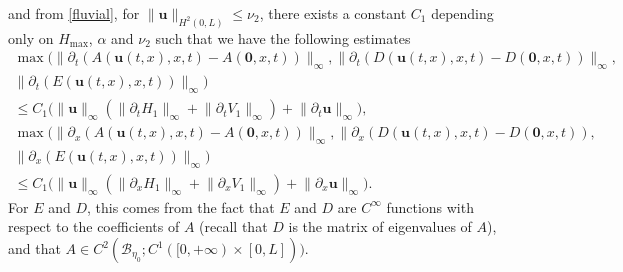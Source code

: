 and from \eqref{fluvial},
for $\lVert\boldsymbol{u}\rVert_{H^{2}(0,L)}\leq \nu_{2}$, there exists a constant $C_{1}$ depending only on $H_{\max}$, $\alpha$ and $\nu_{2}$ such that we have the following estimates
\begin{equation}
\label{ineq}
\begin{split}
\max\bigl(\lVert \partial_{t}(A(\boldsymbol{u}(t,x),x,t)-A(\boldsymbol{0},x,t))\rVert_{\infty},\lVert \partial_{t}(D(\boldsymbol{u}(t,x),x,t)-D(\boldsymbol{0},x,t))\rVert_{\infty},&\\
\lVert \partial_{t}(E(\boldsymbol{u}(t,x),x,t))\rVert_{\infty}\bigr)&\\
\leq C_{1}\bigl(\lVert\boldsymbol{u}\rVert_{\infty}(\lVert\partial_{t}H_{1}\rVert_{\infty}+\lVert\partial_{t}V_{1}\rVert_{\infty})+\lVert\partial_{t}\boldsymbol{u}\rVert_{\infty}\bigr),&\\
\max\bigl(\lVert \partial_{{x}}(A(\boldsymbol{u}(t,x),x,t)-A(\boldsymbol{0},x,t))\rVert_{\infty},\lVert \partial_{{x}}(D(\boldsymbol{u}(t,x),x,t)-D(\boldsymbol{0},x,t)),&\\
\lVert \partial_{{x}}(E(\boldsymbol{u}(t,x),x,t))\rVert_{\infty}\bigr)&\\
\leq C_{1} \bigl(\lVert\boldsymbol{u}\rVert_{\infty}(\lVert\partial_{x}H_{1}\rVert_{\infty}+\lVert\partial_{x}V_{1}\rVert_{\infty})+\lVert\partial_{x}\boldsymbol{u}\rVert_{\infty} \bigr).&
\end{split}
\end{equation}
For $E$ and $D$, this comes from the fact that $E$ and $D$ are $C^{\infty}$ functions with respect to the coefficients of $A$ ({recall} that $D$ is the matrix of eigenvalues of $A$), and that $A\in C^{2}(\mathcal{B}_{\eta_{0}}; C^{1}([0,+\infty)\times[0,L]))$.

